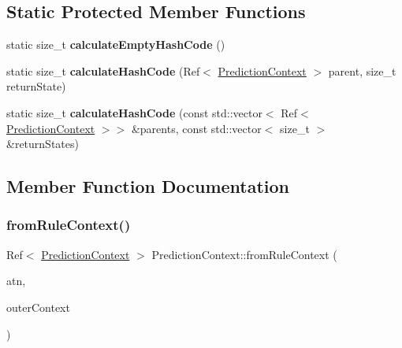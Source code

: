 \subsection*{Static Protected Member Functions}
\begin{DoxyCompactItemize}
\item 
\mbox{\label{classantlr4_1_1atn_1_1PredictionContext_adc67a234509845523ffce76efbd0c832}} 
static size\+\_\+t {\bfseries calculate\+Empty\+Hash\+Code} ()
\item 
\mbox{\label{classantlr4_1_1atn_1_1PredictionContext_aa10edcbcd7db231b01cbb7777d51abe3}} 
static size\+\_\+t {\bfseries calculate\+Hash\+Code} (Ref$<$ \hyperlink{classantlr4_1_1atn_1_1PredictionContext}{Prediction\+Context} $>$ parent, size\+\_\+t return\+State)
\item 
\mbox{\label{classantlr4_1_1atn_1_1PredictionContext_af51cc5e6006d55c3cb9d5439cc37aba9}} 
static size\+\_\+t {\bfseries calculate\+Hash\+Code} (const std\+::vector$<$ Ref$<$ \hyperlink{classantlr4_1_1atn_1_1PredictionContext}{Prediction\+Context} $>$$>$ \&parents, const std\+::vector$<$ size\+\_\+t $>$ \&return\+States)
\end{DoxyCompactItemize}


\subsection{Member Function Documentation}
\mbox{\label{classantlr4_1_1atn_1_1PredictionContext_acb46f102c66b1ae67b44f092e9d78da4}} 
\subsubsection{\texorpdfstring{from\+Rule\+Context()}{fromRuleContext()}}
{\footnotesize\ttfamily Ref$<$ \hyperlink{classantlr4_1_1atn_1_1PredictionContext}{Prediction\+Context} $>$ Prediction\+Context\+::from\+Rule\+Context (\begin{DoxyParamCaption}\item[{const A\+TN \&}]{atn,  }\item[{\hyperlink{classantlr4_1_1RuleContext}{Rule\+Context} $\ast$}]{outer\+Context }\end{DoxyParamCaption})\hspace{0.3cm}{\ttfamily [static]}}

